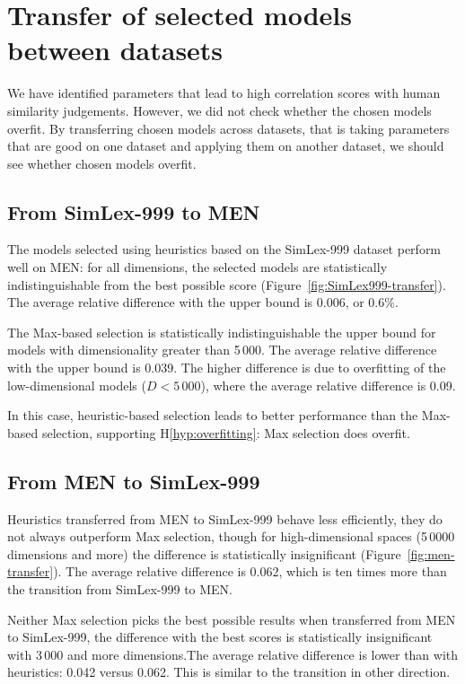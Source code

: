 \section{Transfer of selected models between datasets}
\label{sec:select-model-transf}

We have identified parameters that lead to high correlation scores with human similarity judgements. However, we did not check whether the chosen models overfit. By transferring chosen models across datasets, that is taking parameters that are good on one dataset and applying them on another dataset, we should see whether chosen models overfit. 

\subsection{From SimLex-999 to MEN}
\label{sec:simlex-men}



The models selected using heuristics based on the SimLex-999 dataset perform well on MEN: for all dimensions, the selected models are statistically indistinguishable from the best possible score (Figure~\ref{fig:SimLex999-transfer}). The average relative difference with the upper bound is 0.006, or 0.6\%.

The Max-based selection is statistically indistinguishable the upper bound for models with dimensionality greater than 5\,000. The average relative difference with the upper bound is 0.039. The higher difference is due to overfitting of the low-dimensional models ($D < 5\,000$), where the average relative difference is 0.09.

In this case, heuristic-based selection leads to better performance than the Max-based selection, supporting H\ref{hyp:overfitting}: Max selection does overfit.

\subsection{From MEN to SimLex-999}

Heuristics transferred from MEN to SimLex-999 behave less efficiently, they do not always outperform Max selection, though for high-dimensional spaces (5\,0000 dimensions and more) the difference is statistically insignificant (Figure~\ref{fig:men-transfer}). The average relative difference is 0.062, which is ten times more than the transition from SimLex-999 to MEN.

Neither Max selection picks the best possible results when transferred from MEN to SimLex-999, the difference with the best scores is statistically insignificant with 3\,000 and more dimensions.The average relative difference is lower than with heuristics: 0.042 versus 0.062. This is similar to the transition in other direction.

